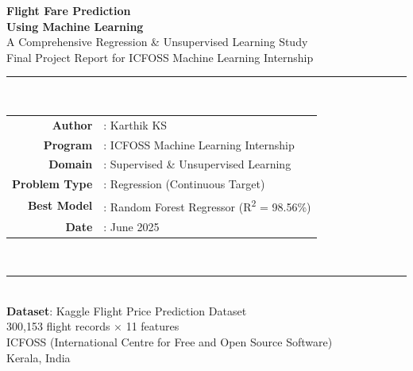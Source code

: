 \documentclass[12pt, a4paper]{article}
\begin{document}
\begin{titlepage}
    \centering
    \vspace*{2cm}
    
    {\Huge\bfseries\textcolor{icfossblue}{Flight Fare Prediction}}\\[0.5cm]
    {\Huge\bfseries\textcolor{icfossblue}{Using Machine Learning}}\\[1.5cm]
    
    {\Large A Comprehensive Regression \& Unsupervised Learning Study}\\[0.3cm]
    {\large Final Project Report for ICFOSS Machine Learning Internship}\\[2cm]
    
    \rule{0.8\textwidth}{0.5pt}\\[0.5cm]
    
    {\large
    \begin{tabular}{rl}
        \textbf{Author}      & : Karthik KS \\[0.3cm]
        \textbf{Program}     & : ICFOSS Machine Learning Internship \\[0.3cm]
        \textbf{Domain}      & : Supervised \& Unsupervised Learning \\[0.3cm]
        \textbf{Problem Type}& : Regression (Continuous Target) \\[0.3cm]
        \textbf{Best Model}  & : Random Forest Regressor (R\textsuperscript{2} = 98.56\%) \\[0.3cm]
        \textbf{Date}        & : June 2025 \\[0.3cm]
    \end{tabular}
    }\\[1cm]
    
    \rule{0.8\textwidth}{0.5pt}\\[1.5cm]
    
    {\large\textbf{Dataset}: Kaggle Flight Price Prediction Dataset}\\[0.2cm]
    {\normalsize 300,153 flight records $\times$ 11 features}\\[1cm]
    
    \vfill
    {\small ICFOSS (International Centre for Free and Open Source Software)}\\
    {\small Kerala, India}
\end{titlepage}

\tableofcontents
\newpage
\end{document}
